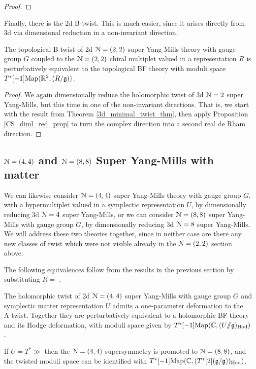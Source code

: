 \documentclass[10pt, oneside]{article}
\newcommand{\ham}{/\!\!/}
\begin{document}
\begin{proof}
 
\end{proof}

Finally, there is the 2d B-twist.  This is much easier, since it arises directly from 3d via dimensional reduction in a non-invariant direction.
\begin{theorem} \label{2d_2_B_twist_thm}
The topological B-twist of 2d $\mathcal{N}=(2,2)$ super Yang-Mills theory with gauge group $G$ coupled to the $\mathcal{N}=(2,2)$ chiral multiplet valued in a representation $R$ is perturbatively equivalent to the topological BF theory with moduli space $T^*[-1]\mathrm{Map}(\mathbb R^2, (R/\mathfrak{g}))$.
\end{theorem}

\begin{proof}
We again dimensionally reduce the holomorphic twist of 3d $\mathcal{N}=2$ super Yang-Mills, but this time in one of the non-invariant directions.  That is, we start with the result from Theorem \ref{3d_minimal_twist_thm}, then apply Proposition \ref{CS_diml_red_prop} to turn the complex direction into a second real de Rham direction.
\end{proof}

\subsection{\texorpdfstring{$\mathcal N=(4,4)$}{N=(4,4)} and \texorpdfstring{$\mathcal N=(8,8)$}{N=(8,8)} Super Yang-Mills with matter} \label{sec:2d(4,4)}
We can likewise consider $\mathcal{N}=(4,4)$ super Yang-Mills theory with gauge group $G$, with a hypermultiplet valued in a symplectic representation $U$, by dimensionally reducing 3d $\mathcal{N}=4$ super Yang-Mills, or we can consider $\mathcal{N}=(8,8)$ super Yang-Mills with gauge group $G$, by dimensionally reducing 3d $\mathcal{N}=8$ super Yang-Mills.  We will address these two theories together, since in neither case are there any new classes of twist which were not visible already in the $\mathcal{N}=(2,2)$ section above.  

The following equivalences follow from the results in the previous section by substituting $R = $ .

\begin{theorem}
The holomorphic twist of 2d $\mathcal{N}=(4,4)$ super Yang-Mills with gauge group $G$ and symplectic matter representation $U$ admits a one-parameter deformation to the A-twist.  Together they are perturbatively equivalent to a holomorphic BF theory and its Hodge deformation, with moduli space given by $T^*[-1]\mr{Map}(\CC, (U \ham \gg)_{\mr{Hod}})$.

If $U = T^*\gg$ then the $\mathcal{N}=(4,4)$ supersymmetry is promoted to $\mathcal{N}=(8,8)$, and the twisted moduli space can be identified with  $T^*[-1]\mathrm{Map}(\mathbb C, (T^*[2](\mathfrak{g} / \mathfrak{g}))_{\mathrm{Hod}})$.
\end{theorem}
\end{document}

